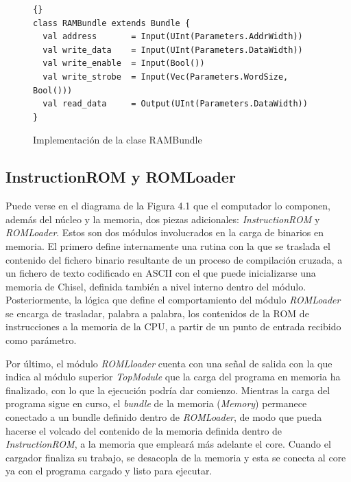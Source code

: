 \begin{figure}[h]
\centering
\begin{minipage}{0.9\linewidth}
\begin{lstlisting}[style=scalaStyle]{}
class RAMBundle extends Bundle {
  val address       = Input(UInt(Parameters.AddrWidth))
  val write_data    = Input(UInt(Parameters.DataWidth))
  val write_enable  = Input(Bool())
  val write_strobe  = Input(Vec(Parameters.WordSize, Bool()))
  val read_data     = Output(UInt(Parameters.DataWidth))
}
\end{lstlisting}
\caption{Implementación de la clase RAMBundle}
\end{minipage}
\end{figure}

\subsection{InstructionROM y ROMLoader}

Puede verse en el diagrama de la Figura 4.1 que el computador lo componen, además del núcleo y la memoria, dos piezas adicionales: \textit{InstructionROM} y \textit{ROMLoader}. Estos son dos módulos involucrados en la carga de binarios en memoria. El primero define internamente una rutina con la que se traslada el contenido del fichero binario resultante de un proceso de compilación cruzada, a un fichero de texto codificado en ASCII con el que puede inicializarse una memoria de Chisel, definida también a nivel interno dentro del módulo. Posteriormente, la lógica que define el comportamiento del módulo \textit{ROMLoader} se encarga de trasladar, palabra a palabra, los contenidos de la ROM de instrucciones a la memoria de la CPU, a partir de un punto de entrada recibido como parámetro.

Por último, el módulo \textit{ROMLloader} cuenta con una señal de salida con la que indica al módulo superior \textit{TopModule} que la carga del programa en memoria ha finalizado, con lo que la ejecución podría dar comienzo. Mientras la carga del programa sigue en curso, el \textit{bundle} de la memoria (\textit{Memory}) permanece conectado a un bundle definido dentro de \textit{ROMLoader}, de modo que pueda hacerse el volcado del contenido de la memoria definida dentro de \textit{InstructionROM}, a la memoria que empleará más adelante el core. Cuando el cargador finaliza su trabajo, se desacopla de la memoria y esta se conecta al core ya con el programa cargado y listo para ejecutar.

